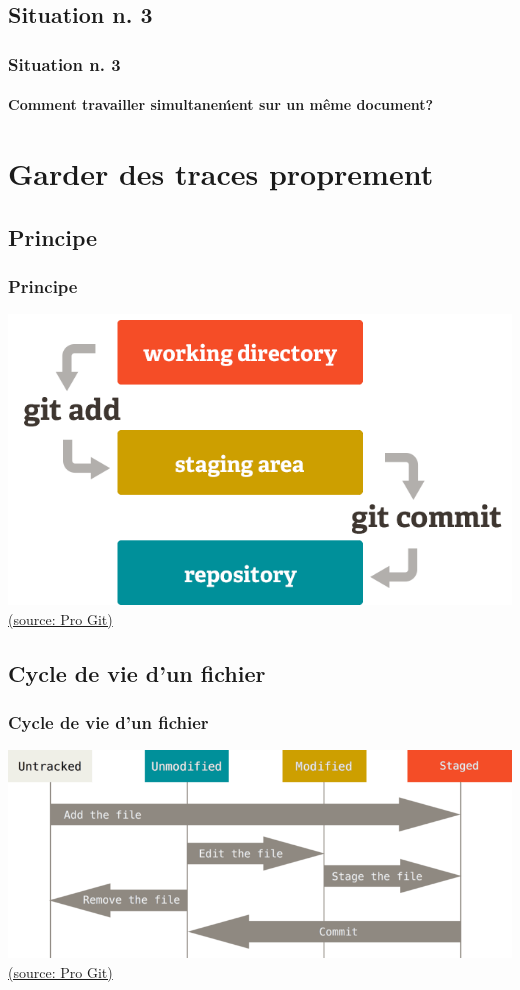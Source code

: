 \documentclass[t,11pt]{beamer}
\begin{document}
\subsection{Situation n. 3}
\begin{frame}[label=sit3]
        \frametitle{Situation n. 3}
        \framesubtitle{Comment travailler simultane\'ment sur un même document?}
\end{frame}

\section{Garder des traces proprement}

\subsection{Principe}
\begin{frame}[c]
        \frametitle{Principe}
        \includegraphics[width=\linewidth]{./img/git_staging_area}
        \newline
        \hspace*{15pt}
        \href{https://git-scm.com/about/staging-area}{{\tiny (source: Pro Git)}}
\end{frame}

\subsection{Cycle de vie d'un fichier}
\begin{frame}[c]
        \frametitle{Cycle de vie d'un fichier}
        \includegraphics[width=\linewidth]{./img/git_cycle}
        \newline
        \hspace*{15pt}
        \href{https://git-scm.com/book/fr/v2/Les-bases-de-Git-Enregistrer-des-modifications-dans-le-d\%C3\%A9p\%C3\%B4t}{{\tiny (source: Pro Git)}}
\end{frame}
\end{document}

